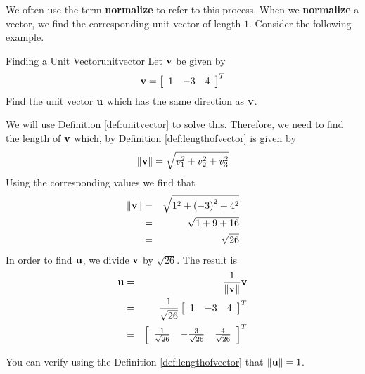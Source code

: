 We often use the term \textbf{normalize} to refer to this process. When we \textbf{normalize} a vector, we find the corresponding unit vector of length $1$. 
Consider the following example.

\begin{example}{Finding a Unit Vector}{unitvector}
Let ${\bf v}$ be given by 
\begin{equation*}
{\bf v}
=
\left[
\begin{array}{rrr}
1 & -3 & 4
\end{array}
\right]^T
\end{equation*}
Find the unit vector ${\bf u}$ which has the same direction as ${\bf v}$.
\end{example}

\begin{solution}
We will use Definition \ref{def:unitvector} to solve this. 
Therefore, we need to find the length of ${\bf v}$ which, by Definition \ref{def:lengthofvector}
is given by 
\begin{equation*}
\|
{\bf v}
\|
= \sqrt{ v_{1}^2 + v_{2}^2+ v_{3}^2}
\end{equation*}
Using the corresponding  values we find that
\begin{eqnarray*}
\|
{\bf v}
\|
&=& \sqrt{ 1^2 + \left(-3 \right)^2 + 4^2} \\
&=& \sqrt{ 1 + 9 + 16} \\
&=& \sqrt{26} 
\end{eqnarray*}
In order to find ${\bf u}$, we divide ${\bf v}$ by $\sqrt{26}$.
The result is 
\begin{eqnarray*}
{\bf u}
&=&
\frac{1}{\| {\bf v} \|}
{\bf v} \\
&=&
\frac{1}{\sqrt{26}}
\left[
\begin{array}{rrr}
1 & -3 & 4
\end{array}
\right]^T \\
&=&
\left[
\begin{array}{rrr}
\frac{1}{\sqrt{26}} & -\frac{3}{\sqrt{26}} & \frac{4}{\sqrt{26}}
\end{array}
\right]^T
\end{eqnarray*}

You can verify using the Definition \ref{def:lengthofvector} that $\| {\bf u} \| = 1 $. 
\end{solution}
